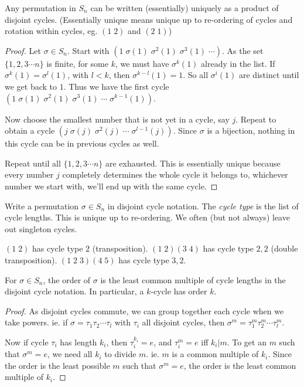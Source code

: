 \documentclass[a4paper]{article}
\begin{document}
  \begin{thm}
    Any permutation in $S_n$ can be written (essentially) uniquely as a product of disjoint cycles. (Essentially unique means unique up to re-ordering of cycles and rotation within cycles, eg. $(1\; 2)$ and $(2\; 1)$)
  \end{thm}

  \begin{proof}
    Let $\sigma\in S_n$. Start with $(1\; \sigma(1)\; \sigma^2(1)\; \sigma^3(1)\;\cdots)$. As the set $\{1, 2, 3\cdots n\}$ is finite, for some $k$, we must have $\sigma^k(1)$ already in the list. If $\sigma^k(1) = \sigma^l(1)$, with $l < k$, then $\sigma^{k-l}(1) = 1$. So all $\sigma^i(1)$ are distinct until we get back to $1$. Thus we have the first cycle $(1\; \sigma(1)\; \sigma^2(1)\; \sigma^3(1)\;\cdots\;\sigma^{k-1}(1))$.

    Now choose the smallest number that is not yet in a cycle, say $j$. Repeat to obtain a cycle $(j\; \sigma(j)\; \sigma^2(j)\;\cdots\; \sigma^{l - 1}(j))$. Since $\sigma$ is a bijection, nothing in this cycle can be in previous cycles as well.

    Repeat until all $\{1, 2, 3\cdots n\}$ are exhausted. This is essentially unique because every number $j$ completely determines the whole cycle it belongs to, whichever number we start with, we'll end up with the same cycle.
  \end{proof}

  \begin{defi}
    Write a permutation $\sigma\in S_n$ in disjoint cycle notation. The \emph{cycle type} is the list of cycle lengths. This is unique up to re-ordering. We often (but not always) leave out singleton cycles.
  \end{defi}
  \begin{eg}
    $(1\; 2)$ has cycle type $2$ (transposition). $(1\; 2)(3\; 4)$ has cycle type $2, 2$ (double transposition). $(1\; 2\; 3)(4\; 5)$ has cycle type $3, 2$.
  \end{eg}
  \begin{lemma}
    For $\sigma\in S_n$, the order of $\sigma$ is the least common multiple of cycle lengths in the disjoint cycle notation. In particular, a $k$-cycle has order $k$.
  \end{lemma}

  \begin{proof}
    As disjoint cycles commute, we can group together each cycle when we take powers. ie. if $\sigma = \tau_1\tau_2\cdots\tau_l$ with $\tau_i$ all disjoint cycles, then $\sigma^m = \tau_1^m\tau_2^m\cdots\tau_l^m$.

    Now if cycle $\tau_i$ has length $k_i$, then $\tau_i^{k_i} = e$, and $\tau_i^m = e$ iff $k_i | m$. To get an $m$ such that $\sigma^m = e$, we need all $k_i$ to divide $m$. ie. $m$ is a common multiple of $k_i$. Since the order is the least possible $m$ such that $\sigma^m = e$, the order is the least common multiple of $k_i$.
  \end{proof}
\end{document}
